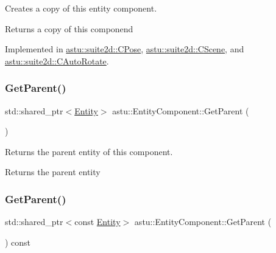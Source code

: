 Creates a copy of this entity component.

\begin{DoxyReturn}{Returns}
a copy of this componend 
\end{DoxyReturn}


Implemented in \hyperlink{classastu_1_1suite2d_1_1CPose_a90d4fb820221ddabf9c95d5a10796359}{astu\+::suite2d\+::\+C\+Pose}, \hyperlink{classastu_1_1suite2d_1_1CScene_ae8dad316175ec4bbfbdb7fff3c736cd3}{astu\+::suite2d\+::\+C\+Scene}, and \hyperlink{classastu_1_1suite2d_1_1CAutoRotate_af130721018671489c7de3f652ffcc8cf}{astu\+::suite2d\+::\+C\+Auto\+Rotate}.

\mbox{\label{classastu_1_1EntityComponent_ae3c2dc735241902588358b933a786603}} 
\subsubsection{\texorpdfstring{Get\+Parent()}{GetParent()}\hspace{0.1cm}{\footnotesize\ttfamily [1/2]}}
{\footnotesize\ttfamily std\+::shared\+\_\+ptr$<$\hyperlink{classastu_1_1Entity}{Entity}$>$ astu\+::\+Entity\+Component\+::\+Get\+Parent (\begin{DoxyParamCaption}{ }\end{DoxyParamCaption})\hspace{0.3cm}{\ttfamily [inline]}}

Returns the parent entity of this component.

\begin{DoxyReturn}{Returns}
the parent entity 
\end{DoxyReturn}
\mbox{\label{classastu_1_1EntityComponent_a33a590990c23ca5bfa8d555b526d7a39}} 
\subsubsection{\texorpdfstring{Get\+Parent()}{GetParent()}\hspace{0.1cm}{\footnotesize\ttfamily [2/2]}}
{\footnotesize\ttfamily std\+::shared\+\_\+ptr$<$const \hyperlink{classastu_1_1Entity}{Entity}$>$ astu\+::\+Entity\+Component\+::\+Get\+Parent (\begin{DoxyParamCaption}{ }\end{DoxyParamCaption}) const\hspace{0.3cm}{\ttfamily [inline]}}

